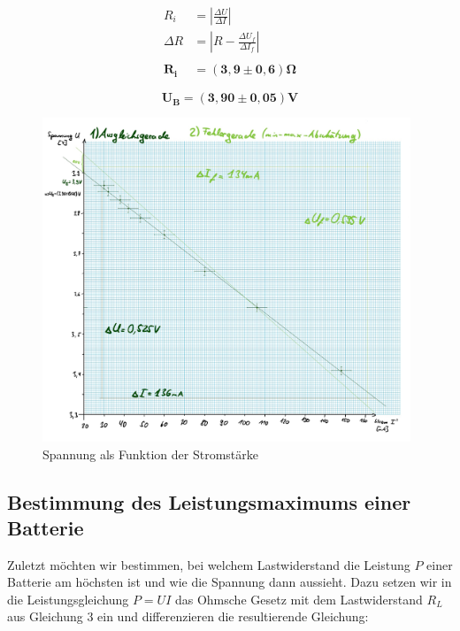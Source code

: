 \documentclass{article}
\begin{document}
\begin{equation}
    \begin{split}
        R_i &= \left| \frac{\Delta U}{\Delta I} \right| \\ 
        \Delta R &= \left| R - \frac{\Delta U_f}{\Delta I_f} \right| \\ \\
        \bm{R_i} &= \bm{(3,9 \pm 0,6) \Omega}
    \end{split}
\end{equation}

\begin{equation}
    \bm{U_B} = \bm{(3,90 \pm 0,05)\textbf{V}}
\end{equation}

\begin{figure} [!h]
    \centering
    \includegraphics[width=11cm]{graphics/spann.jpg}
    \caption{Spannung als Funktion der Stromstärke}
    \label{fig:spann}
\end{figure}

\newpage

\subsection{Bestimmung des Leistungsmaximums einer Batterie}

Zuletzt möchten wir bestimmen, bei welchem Lastwiderstand die Leistung $P$ einer Batterie am höchsten ist und wie die Spannung dann aussieht. Dazu setzen wir in die Leistungsgleichung $P=UI$ das Ohmsche Gesetz mit dem Lastwiderstand $R_L$ aus Gleichung 3 ein und differenzieren die resultierende Gleichung:
\end{document}
